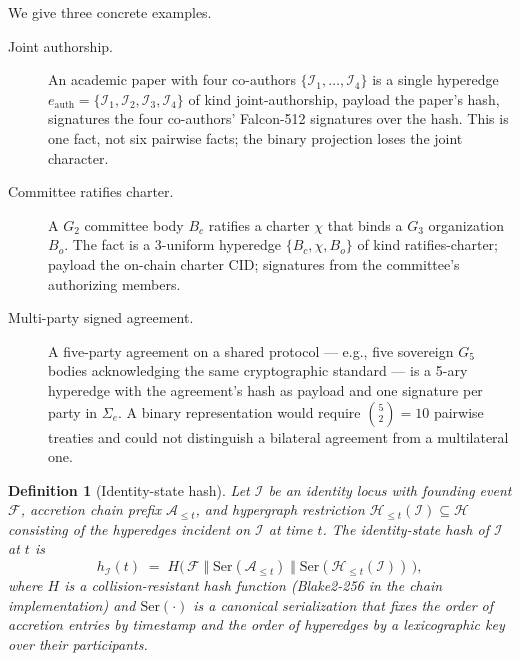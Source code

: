 \documentclass[11pt,a4paper,parskip=half-,DIV=12,headings=standardclasses]{scrartcl}
\theoremstyle{ncthm}
\theoremstyle{ncdef}
\newtheorem{definition}[theorem]{Definition}
\newcommand{\identity}{\mathcal{I}}
\newcommand{\founding}{\mathcal{F}}
\newcommand{\accretion}{\mathcal{A}}
\begin{document}
We give three concrete examples.

\begin{description}
\item[Joint authorship.] An academic paper with four co-authors
  $\{\identity_1, \dots, \identity_4\}$ is a single hyperedge
  $e_{\text{auth}} = \{\identity_1, \identity_2, \identity_3, \identity_4\}$
  of kind \textsf{joint-authorship}, payload the paper's hash,
  signatures the four co-authors' Falcon-512 signatures over the hash.
  This is one fact, not six pairwise facts; the binary projection
  loses the joint character.
\item[Committee ratifies charter.] A $G_2$ committee body $B_c$
  ratifies a charter $\chi$ that binds a $G_3$ organization $B_o$.
  The fact is a 3-uniform hyperedge $\{B_c, \chi, B_o\}$ of kind
  \textsf{ratifies-charter}; payload the on-chain charter CID;
  signatures from the committee's authorizing members.
\item[Multi-party signed agreement.] A five-party agreement on a
  shared protocol --- e.g., five sovereign $G_5$ bodies acknowledging
  the same cryptographic standard --- is a 5-ary hyperedge with the
  agreement's hash as payload and one signature per party in
  $\Sigma_e$. A binary representation would require
  $\binom{5}{2}=10$ pairwise treaties and could not distinguish a
  bilateral agreement from a multilateral one.
\end{description}

\begin{definition}[Identity-state hash]\label{def:state-hash}
Let $\identity$ be an identity locus with founding event $\founding$,
accretion chain prefix $\accretion_{\le t}$, and hypergraph
restriction $\mathcal{H}_{\le t}(\identity) \subseteq \mathcal{H}$
consisting of the hyperedges incident on $\identity$ at time $t$.
The \emph{identity-state hash} of $\identity$ at $t$ is
\[
  h_{\identity}(t) \;=\; H\bigl(\,
    \founding \;\Vert\;
    \mathrm{Ser}(\accretion_{\le t}) \;\Vert\;
    \mathrm{Ser}(\mathcal{H}_{\le t}(\identity))\,\bigr),
\]
where $H$ is a collision-resistant hash function (Blake2-256 in the
chain implementation) and $\mathrm{Ser}(\cdot)$ is a canonical
serialization that fixes the order of accretion entries by timestamp
and the order of hyperedges by a lexicographic key over their
participants.
\end{definition}
\end{document}
